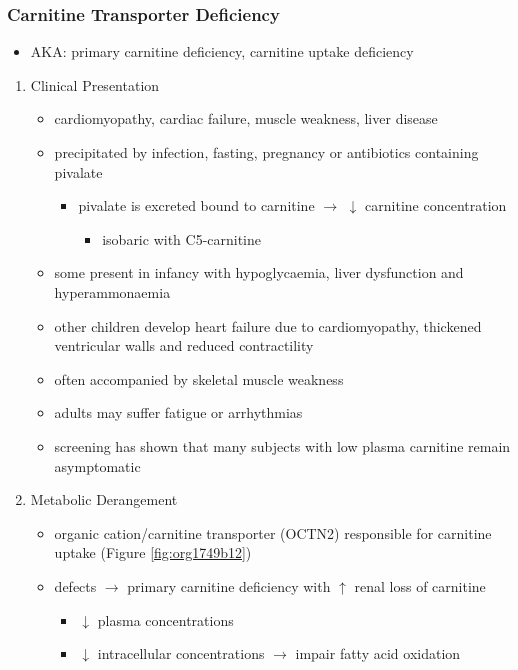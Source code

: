 \documentclass{scrartcl}
\begin{document}
\subsubsection{Carnitine Transporter Deficiency}
\label{sec:org08a3a5c}
\begin{itemize}
\item AKA: primary carnitine deficiency, carnitine uptake deficiency
\end{itemize}
\begin{enumerate}
\item Clinical Presentation
\label{sec:org164aadf}
\begin{itemize}
\item cardiomyopathy, cardiac failure, muscle weakness, liver disease
\item precipitated by infection, fasting, pregnancy or antibiotics containing pivalate
\begin{itemize}
\item pivalate is excreted bound to carnitine \(\to\) \(\downarrow\) carnitine concentration
\begin{itemize}
\item isobaric with C5-carnitine
\end{itemize}
\end{itemize}
\item some present in infancy with hypoglycaemia, liver dysfunction and hyperammonaemia
\item other children develop heart failure due to cardiomyopathy,
thickened ventricular walls and reduced contractility
\item often accompanied by skeletal muscle weakness
\item adults may suffer fatigue or arrhythmias
\item screening has shown that many subjects with low plasma carnitine remain asymptomatic
\end{itemize}
\item Metabolic Derangement
\label{sec:org0778f74}
\begin{itemize}
\item organic cation/carnitine transporter (OCTN2) responsible for
carnitine uptake (Figure \ref{fig:org1749b12})
\item defects \(\to\) primary carnitine deficiency with \(\uparrow\) renal loss of carnitine
\begin{itemize}
\item \(\downarrow\) plasma concentrations
\item \(\downarrow\) intracellular concentrations \(\to\) impair fatty acid
oxidation
\end{itemize}
\end{itemize}


\end{enumerate}
\end{document}
